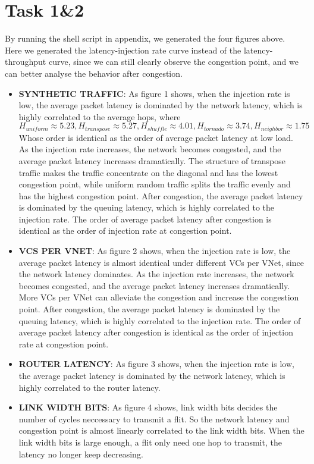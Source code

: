 \documentclass{article}
\begin{document}
\section*{Task 1\&2}
By running the shell script in appendix, we generated the four figures above. Here we generated the latency-injection rate curve instead of the latency-throughput curve, since we can still clearly observe the congestion point, and we can better analyse the behavior after congestion.

\begin{itemize}
    \item \textbf{SYNTHETIC TRAFFIC}: As figure 1 shows, when the injection rate is low, the average packet latency is dominated by the network latency, which is highly correlated to the average hops, where
    $$H_{uniform}\approx 5.23,H_{transpose}\approx 5.27,H_{shuffle}\approx 4.01,H_{tornado}\approx 3.74,H_{neighbor}\approx 1.75$$
	Whose order is identical as the order of average packet latency at low load. As the injection rate increases, the network becomes congested, and the average packet latency increases dramatically. The structure of transpose traffic makes the traffic concentrate on the diagonal and has the lowest congestion point, while uniform random traffic splits the traffic evenly and has the highest congestion point. After congestion, the average packet latency is dominated by the queuing latency, which is highly correlated to the injection rate. The order of average packet latency after congestion is identical as the order of injection rate at congestion point. 
    \item \textbf{VCS PER VNET}: As figure 2 shows, when the injection rate is low, the average packet latency is almost identical under different VCs per VNet, since the network latency dominates. As the injection rate increases, the network becomes congested, and the average packet latency increases dramatically. More VCs per VNet can alleviate the congestion and increase the congestion point. After congestion, the average packet latency is dominated by the queuing latency, which is highly correlated to the injection rate. The order of average packet latency after congestion is identical as the order of injection rate at congestion point.
    \item \textbf{ROUTER LATENCY}: As figure 3 shows, when the injection rate is low, the average packet latency is dominated by the network latency, which is highly correlated to the router latency.
    \item \textbf{LINK WIDTH BITS}: As figure 4 shows, link width bits decides the number of cycles neccessary to transmit a flit. So the network latency and congestion point is almost linearly correlated to the link width bits. When the link width bits is large enough, a flit only need one hop to transmit, the latency no longer keep decreasing.
\end{itemize}
\end{document}
